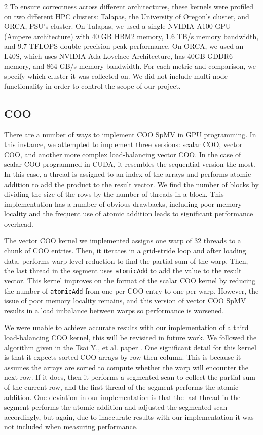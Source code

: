 \documentclass{article}
\begin{document}
\begin{multicols}{2}
To ensure correctness across different architectures, these kernels were profiled on two different HPC clusters: Talapas, the University of Oregon’s cluster, and ORCA, PSU’s cluster. On Talapas, we used a single NVIDIA A100 GPU (Ampere architecture) with 40 GB HBM2 memory, 1.6 TB/s memory bandwidth, and 9.7 TFLOPS double-precision peak performance.
 On ORCA, we used an L40S, which uses NVIDIA Ada Lovelace Architecture, has 40GB GDDR6 memory, and 864 GB/s memory bandwidth. For each metric and comparison, we specify which cluster it was collected on. We did not include multi-node functionality in order to control the scope of our project. 


\subsection{COO}

There are a number of ways to implement COO SpMV in GPU programming. In this instance, we attempted to implement three versions: scalar COO, vector COO, and another more complex load-balancing vector COO. In the case of scalar COO programmed in CUDA, it resembles the sequential version the most. In this case, a thread is assigned to an index of the arrays and performs atomic addition to add the product to the result vector. We find the number of blocks by dividing the size of the rows by the number of threads in a block.  This implementation has a number of obvious drawbacks, including poor memory locality and the frequent use of atomic addition leads to significant performance overhead. \newline

The vector COO kernel we implemented assigns one warp of 32 threads to a chunk of COO entries. Then, it iterates in a grid-stride loop and after loading data, performs warp-level reduction to find the partial-sum of the warp. Then, the last thread in the segment uses \texttt{atomicAdd} to add the value to the result vector. This kernel improves on the format of the scalar COO kernel by reducing the number of \texttt{atomicAdd} from one per COO entry to one per warp. However, the issue of poor memory locality remains, and this version of vector COO SpMV results in a load imbalance between warps so performance is worsened.\newline

We were unable to achieve accurate results with our implementation of a third load-balancing COO kernel, this will be revisited in future work. We followed the algorithm given in the Tsai Y., et al. paper \cite{Tsai2021Race}. One significant detail for this kernel is that it expects sorted COO arrays by row then column. This is because it assumes the arrays are sorted to compute whether the warp will encounter the next row. If it does, then it performs a segmented scan to collect the partial-sum of the current row, and the first thread of the segment performs the atomic addition. One deviation in our implementation is that the last thread in the segment performs the atomic addition and adjusted the segmented scan accordingly, but again, due to inaccurate results with our implementation it was not included when measuring performance.


\end{multicols}
\end{document}
